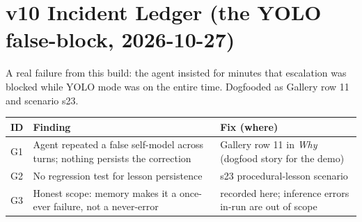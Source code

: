 \section{v10 Incident Ledger (the YOLO false-block, 2026-10-27)}
A real failure from this build: the agent insisted for minutes that escalation was blocked
while YOLO mode was on the entire time. Dogfooded as Gallery row 11 and scenario s23.
\begin{longtable}{@{}p{}p{}p{}@{}}
\toprule
ID & Finding & Fix (where) \\
\midrule
G1 & Agent repeated a false self-model across turns; nothing persists the correction & Gallery row 11 in \emph{Why} (dogfood story for the demo) \\
G2 & No regression test for lesson persistence & s23 procedural-lesson scenario \\
G3 & Honest scope: memory makes it a once-ever failure, not a never-error & recorded here; inference errors in-run are out of scope \\
\bottomrule
\end{longtable}

